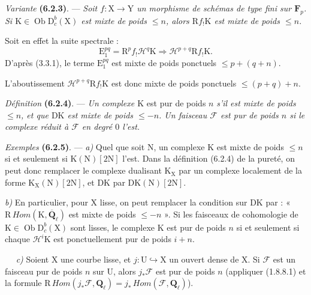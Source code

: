 \documentclass[11pt,leqno]{article}
\newcommand{\Page}[1]{\ifvmode\noindent\else\unskip\ \fi{\footnotesize\textcolor{gray}{[p.\,#1]}}\ \ignorespaces}
\begin{document}
\textit{Variante} \textbf{(6.2.3)}. — \textit{Soit
\(f:\mathrm{X}\to\mathrm{Y}\) un morphisme de schémas de type fini
sur \(\mathbf{F}_p\). Si
\(\mathrm{K}\in\operatorname{Ob}\mathrm{D}_c^b(\mathrm{X})\) est
mixte de poids \(\leq n\), alors \(\mathrm{R}f_!\mathrm{K}\) est
mixte de poids \(\leq n\).}

Soit en effet la suite spectrale :
\[
\mathrm{E}_1^{pq}=\mathrm{R}^pf_!\mathscr{H}^q\mathrm{K}
\Rightarrow\mathscr{H}^{p+q}\mathrm{R}f_!\mathrm{K}.
\]
D’après (3.3.1), le terme \(\mathrm{E}_1^{pq}\) est mixte de poids
ponctuels \(\leq p+(q+n)\).

L’aboutissement \(\mathscr{H}^{p+q}\mathrm{R}f_!\mathrm{K}\) est
donc mixte de poids ponctuels \(\leq(p+q)+n\).

\textit{Définition} \textbf{(6.2.4)}. — \textit{Un complexe
\(\mathrm{K}\)} est pur de poids \(n\) \textit{s’il est mixte de
poids \(\leq n\), et que \(\mathrm{D}\mathrm{K}\) est mixte de
poids \(\leq-n\). Un faisceau \(\mathscr{F}\) est pur de poids
\(n\) si le complexe réduit à \(\mathscr{F}\) en degré \(0\) l’est.}

\textit{Exemples} \textbf{(6.2.5)}. — \textit{a)} Quel que soit
\(\mathrm{N}\), un complexe \(\mathrm{K}\) est mixte de poids
\(\leq n\) si et seulement si \(\mathrm{K}(\mathrm{N})[2\mathrm{N}]\)
l’est. Dans la définition (6.2.4) de la pureté, on peut donc remplacer
le complexe dualisant \(\mathrm{K}_{\mathrm{X}}\) par un complexe
localement de la forme \(\mathrm{K}_{\mathrm{X}}(\mathrm{N})[2\mathrm{N}]\),
et \(\mathrm{D}\mathrm{K}\) par
\(\mathrm{D}\mathrm{K}(\mathrm{N})[2\mathrm{N}]\).

\textit{b)} En particulier, pour \(\mathrm{X}\) lisse, on peut
remplacer la condition sur \(\mathrm{D}\mathrm{K}\) par :
« \(\mathrm{R}\,\mathit{Hom}(\mathrm{K},\overline{\mathbf{Q}}_\ell)\)
est mixte de poids \(\leq-n\) ». Si les faisceaux de cohomologie de
\(\mathrm{K}\in\operatorname{Ob}\mathrm{D}_c^b(\mathrm{X})\) sont
lisses, le complexe \(\mathrm{K}\) est pur de poids \(n\) si et
seulement si chaque \(\mathscr{H}^i\mathrm{K}\) est ponctuellement
pur de poids \(i+n\).

\Page{248}
\textit{c)} Soient \(\mathrm{X}\) une courbe lisse, et
\(j:\mathrm{U}\hookrightarrow\mathrm{X}\) un ouvert dense de
\(\mathrm{X}\). Si \(\mathscr{F}\) est un faisceau pur de poids
\(n\) sur \(\mathrm{U}\), alors \(j_*\mathscr{F}\) est pur de poids
\(n\) (appliquer (1.8.8.1) et la formule
\(\mathrm{R}\,\mathit{Hom}(j_*\mathscr{F},\mathbf{Q}_\ell)
=j_*\,\mathit{Hom}(\mathscr{F},\mathbf{Q}_\ell)\)).
\end{document}

